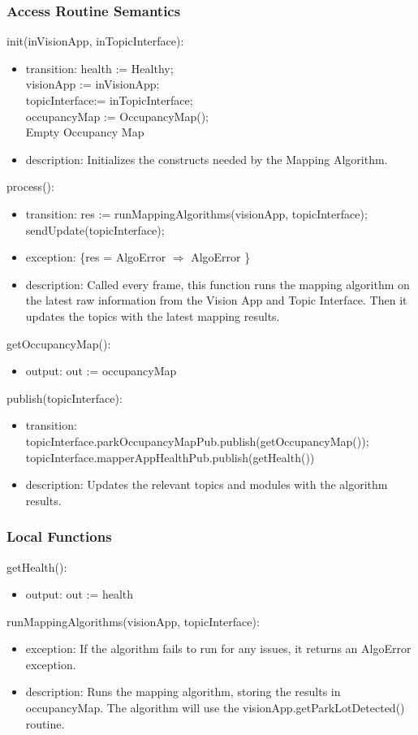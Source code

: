 \documentclass[12pt, titlepage]{article}
\begin{document}
\subsubsection{Access Routine Semantics}
\noindent init(inVisionApp, inTopicInterface):
\begin{itemize}
\item transition: health := Healthy; \\ visionApp := inVisionApp; \\ topicInterface:= inTopicInterface; \\occupancyMap := OccupancyMap(); \\Empty Occupancy Map \\
\item description: Initializes the constructs needed by the Mapping Algorithm.
\end{itemize}
\noindent process():
\begin{itemize}
\item transition: res := runMappingAlgorithms(visionApp, topicInterface); \\
sendUpdate(topicInterface);
\item exception: \{res = AlgoError $\Rightarrow$ AlgoError \}
\item description: Called every frame, this function runs the mapping algorithm on the latest raw information from the Vision App and Topic Interface. Then it updates the topics with the latest mapping results.
\end{itemize}
\noindent getOccupancyMap():
\begin{itemize}
\item output: out := occupancyMap
\end{itemize}
\noindent publish(topicInterface):
\begin{itemize}
\item transition: topicInterface.parkOccupancyMapPub.publish(getOccupancyMap()); \\ topicInterface.mapperAppHealthPub.publish(getHealth())
\item description: Updates the relevant topics and modules with the algorithm results.
\end{itemize}
\subsubsection{Local Functions}
\noindent getHealth():
\begin{itemize}
\item output: out := health 
\end{itemize}
\noindent runMappingAlgorithms(visionApp, topicInterface):
\begin{itemize}
\item exception: If the algorithm fails to run for any issues, it returns an AlgoError exception. 
\item description: Runs the mapping algorithm, storing the results in occupancyMap. The algorithm will use the visionApp.getParkLotDetected() routine.
\end{itemize}
\newpage
\end{document}
